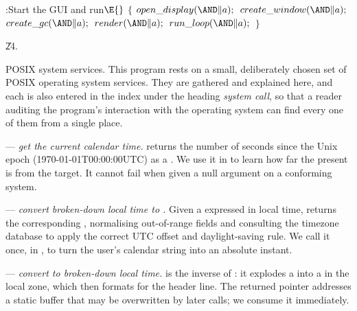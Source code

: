 \Y\B\4:Start the GUI and run\X${}\E{}$\6
${}\{{}$\1\6
${}\\{open\_display}({\AND}\|a);{}$\6
${}\\{create\_window}({\AND}\|a);{}$\6
${}\\{create\_gc}({\AND}\|a);{}$\6
${}\\{render}({\AND}\|a);{}$\6
${}\\{run\_loop}({\AND}\|a);{}$\6
\4${}\}{}$\2\par
\U24.\fi

POSIX system services.
This program rests on a small, deliberately chosen set of POSIX operating
system services.  They are gathered and explained here, and each is also
entered in the index under the heading {\it system call}, so that a reader
auditing the program's interaction with the operating system can find
every one of them from a single place.

\fi

 --- {\it get the current calendar time.}
 returns the number of seconds since the Unix epoch
(1970-01-01T00:00:00\thinspace UTC) as a .  We use it in
 to learn how far the present is from the target.  It
cannot fail when given a null argument on a conforming system.

\fi

 --- {\it convert broken-down local time to .}
Given a  expressed in local time,  returns
the
corresponding , normalising out-of-range fields and consulting
the
 timezone database to apply the correct UTC offset and
daylight-saving
rule.  We call it once, in , to turn the user's calendar
string into an absolute instant.

\fi

 --- {\it convert  to
broken-down local time.}
 is the inverse of : it explodes a  into a
 in the local zone, which  then formats
for the
header line.  The returned pointer addresses a static buffer that may be
overwritten by later calls; we consume it immediately.

